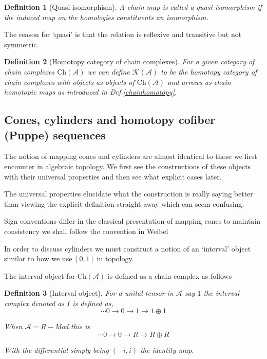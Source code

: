 \documentclass[12pt]{article}
\numberwithin{equation}{section}
\newtheorem{definition}{Definition}[section]
\begin{document}
	
	
	
	\begin{definition}[Quasi-isomorphism]
		A chain map is called a quasi isomorphism if the induced map on the homologies constituents an isomorphism.
	\end{definition}
	The reason for `quasi' is that the relation is reflexive and transitive but not symmetric. 
	\begin{definition}[Homotopy category of chain complexes]
		For a given category of chain complexes $\mathrm{Ch}(\mathcal{A})$ we can define $\mathcal{K}(\mathcal{A})$ to be the homotopy category of chain complexes with objects as objects of $\mathrm{Ch}(\mathcal{A})$ and arrows as chain homotopic maps as introduced in Def.\ref{chainhomotopy}.
	\end{definition}
	
	
	
	\subsection{Cones, cylinders and homotopy cofiber (Puppe) sequences}
	
	
	The notion of mapping cones and cylinders are almost identical to those we first encounter in algebraic topology. We first see the constructions of these objects with their universal properties and then see what explicit cases later.
	
	The universal properties elucidate what the construction is really saying better than viewing the explicit definition straight away which can seem confusing.
	
		Sign conventions differ in the classical presentation of mapping cones to maintain consistency we shall follow the convention in Weibel \cite{weibel_1994}

	In order to discuss cylinders we must construct a notion of an `interval' object similar to how we use $[0,1]$ in topology.
	
	
	The interval object for $\mathrm{Ch}(\mathcal{A})$ is defined as a chain complex as follows
	\begin{definition}[Interval object]
		For a unital tensor in $\mathcal{A}$ say $1$ the interval complex denoted as $I$ is defined as,
		\[ \cdots 0 \to 0 \to 1 \to 1 \oplus 1 \]
		
		When $\mathcal{A}=R-$Mod this is 
		\[ \cdots 0 \to 0 \to R \to R \oplus R \]
		
		With the differential simply being $(-i,i)$ the identity map.
	\end{definition}
	
\end{document}
